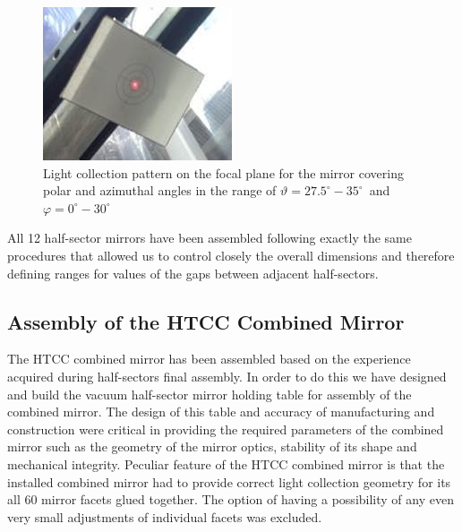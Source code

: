 \begin{figure}[ht]
    \centering
    \includegraphics[width=0.95\linewidth]{images/Focal_Plane_1R.jpg}
    \caption{Light collection pattern on the focal plane for the mirror covering polar and azimuthal angles in the range of $\vartheta = 27.5^\circ - 35^\circ$\, and\, $\varphi = 0^\circ - 30^\circ$}
    \label{fig:Focal_Plane_1R}
\end{figure}

\indent All 12 half-sector mirrors have been assembled following exactly the same procedures that allowed us to control closely the overall dimensions and therefore defining ranges for values of the gaps between adjacent half-sectors. 

\subsection{Assembly of the HTCC Combined Mirror}

 The HTCC combined mirror has been assembled based on the experience acquired during half-sectors final assembly. In order to do this we have designed and build the vacuum half-sector mirror holding table for assembly of the combined mirror. The design of this table and accuracy of manufacturing and construction were critical in providing the required parameters of the combined mirror such as the geometry of the mirror optics, stability of its shape and mechanical integrity. Peculiar feature of the HTCC combined mirror is that the installed combined mirror had to provide correct light collection geometry for its all 60 mirror facets glued together. The option of having a possibility of any even very small adjustments of individual facets was excluded.
 
